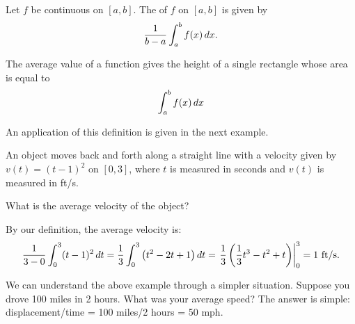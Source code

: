 \documentclass{ximera}
\begin{document}
\begin{definition}
  Let $f$ be continuous on $[a,b]$. The  of $f$ on
  $[a,b]$ is given by
  \[
  \frac{1}{b-a}\int_a^b f(x)\,d x.
  \]
\end{definition}

The average value of a function gives the height of a single rectangle whose area is equal to
\[
\int_a^b f(x) \,d x
\]
\begin{image}
\end{image}

An application of this definition is given in the next example.


\begin{example}
An object moves back and forth along a straight line with a velocity
given by $v(t) = (t-1)^2$ on $[0,3]$, where $t$ is measured in seconds
and $v(t)$ is measured in ft/s.

What is the average velocity of the object?
\begin{explanation}
By our definition, the average velocity is:
\[
\frac{1}{3-0}\int_0^3 (t-1)^2\,d t =\frac13 \int_0^3 \big(t^2-2t+1\big)\,d t = \left.\frac13\left(\frac13t^3-t^2+t\right)\right|_0^3 = 1\text{ ft/s}.
\]
\end{explanation}
\end{example}

We can understand the above example through a simpler
situation. Suppose you drove 100 miles in 2 hours. What was your
average speed? The answer is simple: displacement/time = 100 miles/2
hours = 50 mph.
\end{document}
